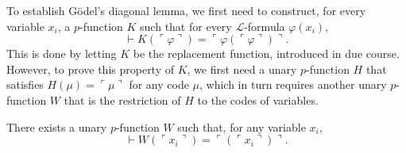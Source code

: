 To establish Gödel’s diagonal lemma, we first need to construct, for every variable $x_i$, 
a $p$-function $K$ such that for every $\mathcal{L}$-formula $\varphi(x_i)$,
$$
\vdash K (\ulcorner{\varphi}\urcorner) = \ulcorner{\varphi(\ulcorner {\varphi} \urcorner)}\urcorner.
$$
This is done by letting $K$ be the replacement function, introduced in due course.
However, to prove this property of $K$, we first need a unary $p$-function $H$
that satisfies $H(\mu) = \ulcorner {\mu} \urcorner$ for any code $\mu$, which in turn requires
another unary $p$-function $W$ that is the restriction of $H$ to the codes of variables.

\begin{lemma}
    \label{lem:Code.exists_pFunc_forall_var_eq_code}
    There exists a unary $p$-function $W$ such that, for any variable $x_i$,
    $$
    \vdash W(\ulcorner{x_i}\urcorner) = \ulcorner{(\ulcorner{x_i}\urcorner)}\urcorner.
    $$
\end{lemma}

